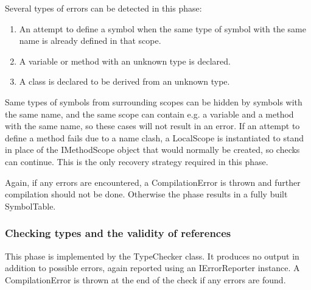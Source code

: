 \documentclass[a4paper,11pt]{article}
\begin{document}
Several types of errors can be detected in this phase:
\begin{enumerate}
\item An attempt to define a symbol when the same type of symbol with the same name is already defined in that scope.
\item A variable or method with an unknown type is declared.
\item A class is declared to be derived from an unknown type.
\end{enumerate}

Same types of symbols from surrounding scopes can be hidden by symbols with the same name, and the same scope can contain e.g. a variable and a method with the same name, so these cases will not result in an error. If an attempt to define a method fails due to a name clash, a LocalScope is instantiated to stand in place of the IMethodScope object that would normally be created, so checks can continue. This is the only recovery strategy required in this phase.

Again, if any errors are encountered, a CompilationError is thrown and further compilation should not be done. Otherwise the phase results in a fully built SymbolTable.

\subsubsection{Checking types and the validity of references}

This phase is implemented by the TypeChecker class. It produces no output in addition to possible errors, again reported using an IErrorReporter instance. A CompilationError is thrown at the end of the check if any errors are found.
\end{document}
